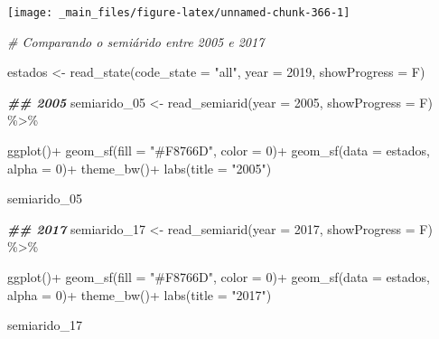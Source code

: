 \documentclass[
  brazilian,
]{book}
\newenvironment{Shaded}{\begin{snugshade}}{\end{snugshade}}
\newcommand{\AttributeTok}[1]{\textcolor[rgb]{0.77,0.63,0.00}{#1}}
\newcommand{\CommentTok}[1]{\textcolor[rgb]{0.56,0.35,0.01}{\textit{#1}}}
\newcommand{\DecValTok}[1]{\textcolor[rgb]{0.00,0.00,0.81}{#1}}
\newcommand{\DocumentationTok}[1]{\textcolor[rgb]{0.56,0.35,0.01}{\textbf{\textit{#1}}}}
\newcommand{\FunctionTok}[1]{\textcolor[rgb]{0.00,0.00,0.00}{#1}}
\newcommand{\NormalTok}[1]{#1}
\newcommand{\OtherTok}[1]{\textcolor[rgb]{0.56,0.35,0.01}{#1}}
\newcommand{\SpecialCharTok}[1]{\textcolor[rgb]{0.00,0.00,0.00}{#1}}
\newcommand{\StringTok}[1]{\textcolor[rgb]{0.31,0.60,0.02}{#1}}
\begin{document}
\begin{center}\texttt{[image: \_main\_files/figure-latex/unnamed-chunk-366-1]} \end{center}

\begin{Shaded}
\begin{Highlighting}[]
\CommentTok{\# Comparando o semiárido entre 2005 e 2017}

\NormalTok{estados }\OtherTok{\textless{}{-}} \FunctionTok{read\_state}\NormalTok{(}\AttributeTok{code\_state =} \StringTok{"all"}\NormalTok{,}
                      \AttributeTok{year =} \DecValTok{2019}\NormalTok{,}
                      \AttributeTok{showProgress =}\NormalTok{ F)}

\DocumentationTok{\#\# 2005}
\NormalTok{semiarido\_05 }\OtherTok{\textless{}{-}} \FunctionTok{read\_semiarid}\NormalTok{(}\AttributeTok{year =} \DecValTok{2005}\NormalTok{,}
                              \AttributeTok{showProgress =}\NormalTok{ F) }\SpecialCharTok{\%\textgreater{}\%} 
  
  \FunctionTok{ggplot}\NormalTok{()}\SpecialCharTok{+}
  \FunctionTok{geom\_sf}\NormalTok{(}\AttributeTok{fill =} \StringTok{"\#F8766D"}\NormalTok{,}
          \AttributeTok{color =} \DecValTok{0}\NormalTok{)}\SpecialCharTok{+}
  \FunctionTok{geom\_sf}\NormalTok{(}\AttributeTok{data =}\NormalTok{ estados,}
          \AttributeTok{alpha =} \DecValTok{0}\NormalTok{)}\SpecialCharTok{+}
  \FunctionTok{theme\_bw}\NormalTok{()}\SpecialCharTok{+}
  \FunctionTok{labs}\NormalTok{(}\AttributeTok{title =} \StringTok{"2005"}\NormalTok{)}

\NormalTok{semiarido\_05}
\end{Highlighting}
\end{Shaded}

\begin{Shaded}
\begin{Highlighting}[]
\DocumentationTok{\#\# 2017}
\NormalTok{semiarido\_17 }\OtherTok{\textless{}{-}} \FunctionTok{read\_semiarid}\NormalTok{(}\AttributeTok{year =} \DecValTok{2017}\NormalTok{,}
                              \AttributeTok{showProgress =}\NormalTok{ F) }\SpecialCharTok{\%\textgreater{}\%} 
  
  \FunctionTok{ggplot}\NormalTok{()}\SpecialCharTok{+}
  \FunctionTok{geom\_sf}\NormalTok{(}\AttributeTok{fill =} \StringTok{"\#F8766D"}\NormalTok{,}
          \AttributeTok{color =} \DecValTok{0}\NormalTok{)}\SpecialCharTok{+}
  \FunctionTok{geom\_sf}\NormalTok{(}\AttributeTok{data =}\NormalTok{ estados,}
          \AttributeTok{alpha =} \DecValTok{0}\NormalTok{)}\SpecialCharTok{+}
  \FunctionTok{theme\_bw}\NormalTok{()}\SpecialCharTok{+}
  \FunctionTok{labs}\NormalTok{(}\AttributeTok{title =} \StringTok{"2017"}\NormalTok{)}

\NormalTok{semiarido\_17}
\end{Highlighting}
\end{Shaded}
\end{document}
